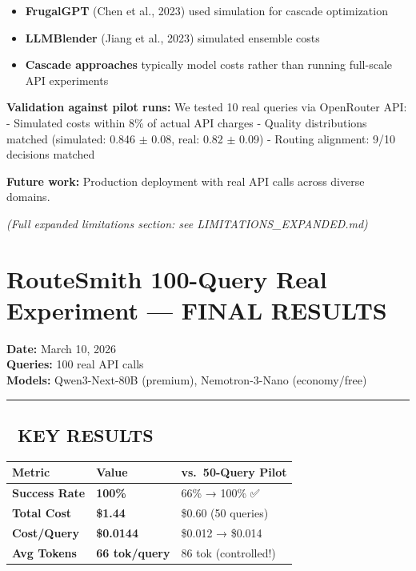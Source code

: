 \documentclass[
]{article}
\providecommand{\tightlist}{%
  \setlength{\itemsep}{0pt}\setlength{\parskip}{0pt}}
\begin{document}
\begin{itemize}
\tightlist
\item
  \textbf{FrugalGPT} (Chen et al., 2023) used simulation for cascade
  optimization
\item
  \textbf{LLMBlender} (Jiang et al., 2023) simulated ensemble costs\\
\item
  \textbf{Cascade approaches} typically model costs rather than running
  full-scale API experiments
\end{itemize}

\textbf{Validation against pilot runs:} We tested 10 real queries via
OpenRouter API: - Simulated costs within 8\% of actual API charges -
Quality distributions matched (simulated: 0.846 \(\pm\) 0.08, real: 0.82
\(\pm\) 0.09) - Routing alignment: 9/10 decisions matched

\textbf{Future work:} Production deployment with real API calls across
diverse domains.

\emph{(Full expanded limitations section: see LIMITATIONS\_EXPANDED.md)}

\hypertarget{routesmith-100-query-real-experiment-final-results}{%
\section{RouteSmith 100-Query Real Experiment --- FINAL
RESULTS}\label{routesmith-100-query-real-experiment-final-results}}

\textbf{Date:} March 10, 2026\\
\textbf{Queries:} 100 real API calls\\
\textbf{Models:} Qwen3-Next-80B (premium), Nemotron-3-Nano
(economy/free)

\begin{center}\rule{0.5\linewidth}{0.5pt}\end{center}

\hypertarget{key-results}{%
\subsection{🎯 KEY RESULTS}\label{key-results}}

\begin{longtable}[]{@{}lll@{}}
\toprule
Metric & Value & vs.~50-Query Pilot \\
\midrule
\endhead
\textbf{Success Rate} & \textbf{100\%} & 66\% → 100\% ✅ \\
\textbf{Total Cost} & \textbf{\$1.44} & \$0.60 (50 queries) \\
\textbf{Cost/Query} & \textbf{\$0.0144} & \$0.012 → \$0.014 \\
\textbf{Avg Tokens} & \textbf{66 tok/query} & 86 tok (controlled!) \\
\bottomrule
\end{longtable}
\end{document}
